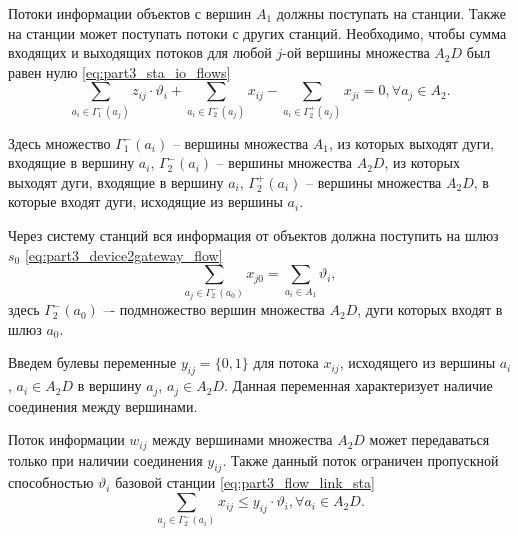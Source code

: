 Потоки информации объектов с вершин $A_1$ должны поступать на станции. Также на станции может поступать потоки с других станций. Необходимо, чтобы сумма входящих и выходящих потоков для любой $j$-ой вершины множества $A_2D$ был равен нулю \cref{eq:part3_sta_io_flows} 
\begin{equation}\label{eq:part3_sta_io_flows} 
    \sum_{a_i \in \Gamma_1^-(a_j)} z_{ij} \cdot \vartheta_i + \sum_{a_i \in \Gamma_2^-(a_j)} x_{ij} -  \sum_{a_i \in \Gamma_2^+(a_j)} x_{ji} =0 ,\forall a_j \in A_2. 
\end{equation} 


Здесь множество $\Gamma_1^-(a_i)$ -- вершины множества $A_1$, из которых выходят дуги, входящие в вершину $a_i$, $\Gamma_2^-(a_i)$ -- вершины множества $A_2D$, из которых выходят дуги, входящие в  вершину $a_i$, $\Gamma_2^+(a_i)$ -- вершины множества $A_2D$, в которые входят дуги, исходящие из вершины  $a_i$.

Через систему станций вся информация от объектов  должна поступить на шлюз $s_0$ \cref{eq:part3_device2gateway_flow} 
\begin{equation}\label{eq:part3_device2gateway_flow}
    \sum_{a_j \in \Gamma_2^-(a_0)} x_{j0} = \sum_{a_i \in A_1} \vartheta_i,
\end{equation}
здесь $\Gamma_2^-(a_0)$ –- подмножество вершин множества $A_2D$, дуги которых входят в шлюз $a_0$.

Введем булевы переменные $y_{ij} = \{0,1\}$ для потока $x_{ij}$, исходящего из вершины $a_i$, $a_i \in A_2D$ в вершину $a_j$, $a_j \in A_2D$. Данная переменная характеризует наличие соединения между вершинами.

Поток информации $w_{ij}$ между вершинами множества $A_2D$ может передаваться только при наличии соединения $y_{ij}$. Также данный поток ограничен пропускной способностью $\vartheta_i$ базовой станции  \cref{eq:part3_flow_link_sta}
\begin{equation}\label{eq:part3_flow_link_sta}
    \sum_{a_j \in \Gamma_2^-(a_i)} x_{ij} \leqslant y_{ij} \cdot \vartheta_i, \forall a_i \in A_2D.
\end{equation}


